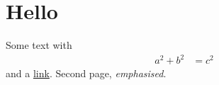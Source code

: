 \documentclass{article}
\begin{document}
\section{Hello}
Some text with
\begin{align}
  a^2+b^2 &= c^2
\end{align}
and a \href{https://example.org}{link}.
\newpage
Second page, \emph{emphasised}.
\end{document}
